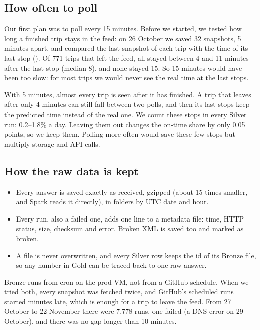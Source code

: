 \subsection*{How often to poll}

Our first plan was to poll every 15 minutes. Before we started, we tested how long a finished
trip stays in the feed: on 26 October we saved 32 snapshots, 5 minutes apart, and compared the
last snapshot of each trip with the time of its last stop ().
Of 771 trips that left the feed, all stayed between 4 and 11 minutes after the last stop
(median 8), and none stayed 15. So 15 minutes would have been too slow: for most trips we would
never see the real time at the last stops.

With 5 minutes, almost every trip is seen after it has finished. A trip that leaves after only
4 minutes can still fall between two polls, and then its last stops keep the predicted time
instead of the real one. We count these stops in every Silver run: 0.2--1.8\% a day. Leaving
them out changes the on-time share by only 0.05 points, so we keep them. Polling more often
would save these few stops but multiply storage and API calls.

\subsection*{How the raw data is kept}

\begin{itemize}
  \item Every answer is saved exactly as received, gzipped (about 15 times smaller, and Spark
        reads it directly), in folders by UTC date and hour.
  \item Every run, also a failed one, adds one line to a metadata file: time, HTTP status, size,
        checksum and error. Broken XML is saved too and marked as broken.
  \item A file is never overwritten, and every Silver row keeps the id of its Bronze file, so
        any number in Gold can be traced back to one raw answer.
\end{itemize}

Bronze runs from cron on the prod VM, not from a GitHub schedule. When we tried both, every
snapshot was fetched twice, and GitHub's scheduled runs started minutes late, which is enough
for a trip to leave the feed. From 27 October to 22 November there were 7{,}778 runs, one
failed (a DNS error on 29 October), and there was no gap longer than 10 minutes.

